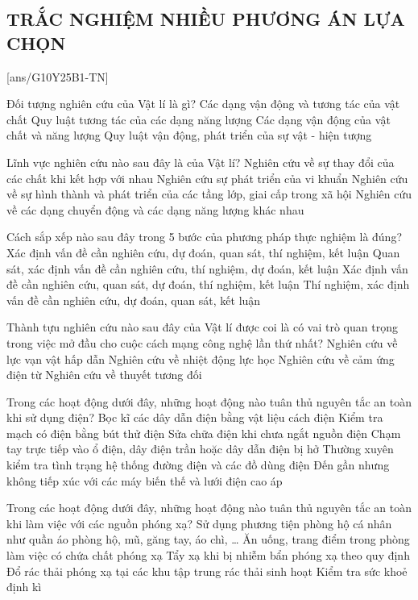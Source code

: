 \subsection{TRẮC NGHIỆM NHIỀU PHƯƠNG ÁN LỰA CHỌN}
\setcounter{ex}{0}
[ans/G10Y25B1-TN]
\begin{ex}
	Đối tượng nghiên cứu của Vật lí là gì?
	\choice
	{Các dạng vận động và tương tác của vật chất}
	{Quy luật tương tác của các dạng năng lượng}
	{\True Các dạng vận động của vật chất và năng lượng}
	{Quy luật vận động, phát triển của sự vật - hiện tượng}
	\loigiai{}
\end{ex}

\begin{ex}
	Lĩnh vực nghiên cứu nào sau đây là của Vật lí?
	\choice
	{Nghiên cứu về sự thay đổi của các chất khi kết hợp với nhau}
	{Nghiên cứu sự phát triển của vi khuẩn}
	{Nghiên cứu về sự hình thành và phát triển của các tầng lớp, giai cấp trong xã hội}
	{\True Nghiên cứu về các dạng chuyển động và các dạng năng lượng khác nhau}
	\loigiai{}
\end{ex}

\begin{ex}
	Cách sắp xếp nào sau đây trong 5 bước của phương pháp thực nghiệm là đúng?
	\choice
	{Xác định vấn đề cần nghiên cứu, dự đoán, quan sát, thí nghiệm, kết luận}
	{Quan sát, xác định vấn đề cần nghiên cứu, thí nghiệm, dự đoán, kết luận}
	{\True Xác định vấn đề cần nghiên cứu, quan sát, dự đoán, thí nghiệm, kết luận}
	{Thí nghiệm, xác định vấn đề cần nghiên cứu, dự đoán, quan sát, kết luận}
	\loigiai{}
\end{ex}

\begin{ex}
	Thành tựu nghiên cứu nào sau đây của Vật lí được coi là có vai trò quan trọng trong việc mở đầu cho cuộc cách mạng công nghệ lần thứ nhất?
	\choice
	{Nghiên cứu về lực vạn vật hấp dẫn}
	{\True Nghiên cứu về nhiệt động lực học}
	{Nghiên cứu về cảm ứng điện từ}
	{Nghiên cứu về thuyết tương đối}
	\loigiai{}
\end{ex}
\begin{ex}
	Trong các hoạt động dưới đây, những hoạt động nào tuân thủ nguyên tắc an toàn khi sử dụng điện?
	\choice
	{Bọc kĩ các dây dẫn điện bằng vật liệu cách điện}
	{Kiểm tra mạch có điện bằng bút thử điện}
	{Sửa chữa điện khi chưa ngắt nguồn điện}
	{Chạm tay trực tiếp vào ổ điện, dây điện trần hoặc dây dẫn điện bị hở}
	{Thường xuyên kiểm tra tình trạng hệ thống đường điện và các đồ dùng điện}
	{Đến gần nhưng không tiếp xúc với các máy biến thế và lưới điện cao áp}
\end{ex}

\begin{ex}
	Trong các hoạt động dưới đây, những hoạt động nào tuân thủ nguyên tắc an toàn khi làm việc với các nguồn phóng xạ?
	\choice
	{Sử dụng phương tiện phòng hộ cá nhân như quần áo phòng hộ, mũ, găng tay, áo chì, \dots}
	{Ăn uống, trang điểm trong phòng làm việc có chứa chất phóng xạ}
	{Tẩy xạ khi bị nhiễm bẩn phóng xạ theo quy định}
	{Đổ rác thải phóng xạ tại các khu tập trung rác thải sinh hoạt}
	{Kiểm tra sức khoẻ định kì}
\end{ex}
